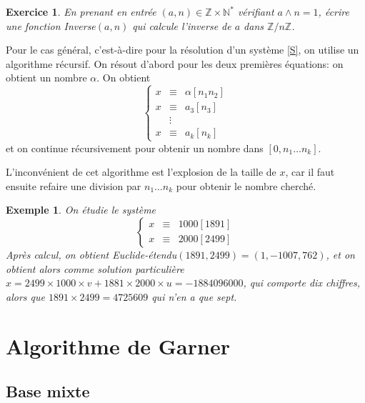 \documentclass[12pt]{report}
\newtheorem*{ex}{Exemple}
\newtheorem*{exo}{Exercice}
\begin{document}
\begin{exo}
En prenant en entrée $(a,n)\in \mathbb{Z}\times \mathbb{N}^*$ vérifiant $a \wedge n=1$, écrire une fonction Inverse$(a,n)$ qui calcule l'inverse de $a$ dans $\mathbb{Z}/n \mathbb{Z}$.
\end{exo}


Pour le cas général, c'est-à-dire pour la résolution d'un système \eqref{S}, on utilise un algorithme récursif. On résout d'abord pour les deux premières équations: on obtient un nombre $\alpha$. On obtient
\begin{equation*}
\left \{ \begin{array}{ccc}
x & \equiv & \alpha [n_1 n_2] \\
x & \equiv & a_3 [n_3] \\
  &      \vdots    &   \\
x & \equiv & a_k [n_k]   
\end{array}   \right.
\end{equation*}
et on continue récursivement pour obtenir un nombre dans $[0, n_1 \ldots n_k]$.\par 
L'inconvénient de cet algorithme est l'explosion de la taille de $x$, car il faut ensuite refaire une division par $n_1 \ldots n_k$ pour obtenir le nombre cherché.

\begin{ex}
On étudie le système
\begin{equation}\label{Ex}
\left \{ \begin{array}{ccc}
x & \equiv &  1000 [1891] \\
x & \equiv & 2000 [2499]
\end{array}   \right.
\end{equation}
Après calcul, on obtient Euclide-étendu$(1891,2499)=(1,-1007,762)$, et on obtient alors comme solution particulière $x = 2499 \times 1000 \times v + 1881 \times 2000 \times u= -1884096000$, qui comporte dix chiffres, alors que $1891 \times 2499= 4725609 $ qui n'en a que sept.
\end{ex}


\section{Algorithme de Garner}

\subsection{Base mixte}

\end{document}
